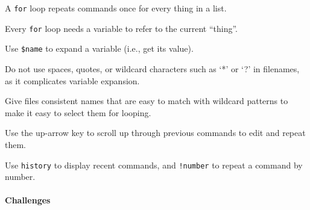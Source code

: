 \documentclass{book}
\begin{document}
\begin{keypoints}
\begin{swcitemize}
\item
  A \texttt{for} loop repeats commands once for every thing in a list.
\item
  Every \texttt{for} loop needs a variable to refer to the current
  ``thing''.
\item
  Use \texttt{\$name} to expand a variable (i.e., get its value).
\item
  Do not use spaces, quotes, or wildcard characters such as `*' or `?'
  in filenames, as it complicates variable expansion.
\item
  Give files consistent names that are easy to match with wildcard
  patterns to make it easy to select them for looping.
\item
  Use the up-arrow key to scroll up through previous commands to edit
  and repeat them.
\item
  Use \texttt{history} to display recent commands, and \texttt{!number}
  to repeat a command by number.
\end{swcitemize}
\end{keypoints}

\mbox{}\paragraph{Challenges}
\end{document}
